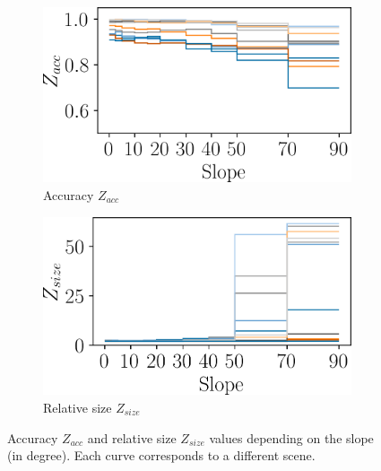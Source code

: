 \begin{figure}
    \begin{subfigure}[t]{0.495\linewidth}
        \flushleft
        \includegraphics[width=\linewidth]{Images/Chap_6/slope_acc.png}
        \caption{Accuracy $Z_{acc}$}
        \label{fig:slope_acc}
    \end{subfigure}
    \begin{subfigure}[t]{0.495\linewidth}
        \flushright
        \includegraphics[width=\linewidth]{Images/Chap_6/slope_s_rel.png}
        \caption{Relative size $Z_{size}$}
        \label{fig:slope_size}
    \end{subfigure}
    \caption{Accuracy $Z_{acc}$ and relative size $Z_{size}$ values depending on the slope (in degree). Each curve corresponds to a different scene.}
    \label{fig:slope_acc_size}
\end{figure}

